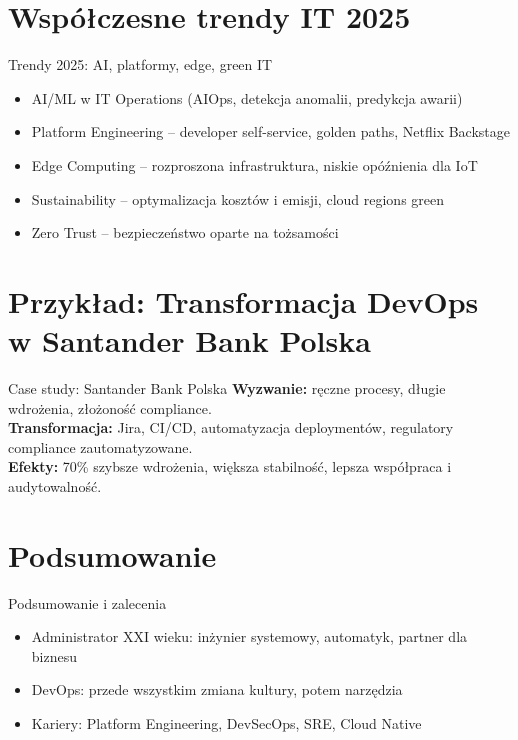 \documentclass[aspectratio=169]{beamer}
\begin{document}
\section{Współczesne trendy IT 2025}
\begin{frame}{Trendy 2025: AI, platformy, edge, green IT}
\begin{itemize}
    \item AI/ML w IT Operations (AIOps, detekcja anomalii, predykcja awarii)
    \item Platform Engineering – developer self-service, golden paths, Netflix Backstage
    \item Edge Computing – rozproszona infrastruktura, niskie opóźnienia dla IoT
    \item Sustainability – optymalizacja kosztów i emisji, cloud regions green
    \item Zero Trust – bezpieczeństwo oparte na tożsamości
\end{itemize}
\end{frame}

\section{Przykład: Transformacja DevOps w Santander Bank Polska}
\begin{frame}{Case study: Santander Bank Polska}
\textbf{Wyzwanie:} ręczne procesy, długie wdrożenia, złożoność compliance.\\
\textbf{Transformacja:} Jira, CI/CD, automatyzacja deploymentów, regulatory compliance zautomatyzowane.\\
\textbf{Efekty:} 70\% szybsze wdrożenia, większa stabilność, lepsza współpraca i audytowalność.
\end{frame}

\section{Podsumowanie}
\begin{frame}{Podsumowanie i zalecenia}
\begin{itemize}
    \item Administrator XXI wieku: inżynier systemowy, automatyk, partner dla biznesu
    \item DevOps: przede wszystkim zmiana kultury, potem narzędzia
    \item Kariery: Platform Engineering, DevSecOps, SRE, Cloud Native
\end{itemize}

\end{frame}
\end{document}
